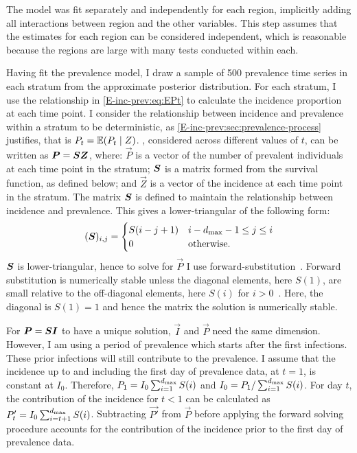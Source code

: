 \documentclass[thesis.tex]{subfiles}
\begin{document}
The model was fit separately and independently for each region, implicitly adding all interactions between region and the other variables.
This step assumes that the estimates for each region can be considered independent, which is reasonable because the regions are large with many tests conducted within each.

Having fit the prevalence model, I draw a sample of 500 prevalence time series in each stratum from the approximate posterior distribution.
For each stratum, I use the relationship in \cref{E-inc-prev:eq:EPt} to calculate the incidence proportion at each time point.
I consider the relationship between incidence and prevalence within a stratum to be deterministic, as \cref{E-inc-prev:sec:prevalence-process} justifies, that is $P_t = \operatorname{\mathbb{E}}(P_t \mid Z)$.
, considered across different values of $t$, can be written as $\bm{P} = \bm{S} \bm{Z}$, where: $\vec{P}$ is a vector of the number of prevalent individuals at each time point in the stratum; $\bm{S}$ is a matrix formed from the survival function, as defined below; and $\vec{Z}$ is a vector of the incidence at each time point in the stratum.
The matrix $\bm{S}$ is defined to maintain the relationship between incidence and prevalence.
This gives a lower-triangular of the following form:
\begin{align}
    (\bm{S})_{i,j} = \begin{cases}
        S(i - j + 1) & i - d_\text{max} - 1 \leq j \leq i \\
        0 & \text{otherwise.}
    \end{cases}
\end{align}
$\bm{S}$ is lower-triangular, hence to solve for $\vec{P}$ I use forward-substitution~\autocite{cormenMatrix}.
Forward substitution is numerically stable unless the diagonal elements, here $S(1)$, are small relative to the off-diagonal elements, here $S(i)$ for $i > 0$~\autocite[section 8.2]{highamAccuracy}.
Here, the diagonal is $S(1) = 1$ and hence the matrix the solution is numerically stable.

For $\bm{P} = \bm{S} \bm{I}$ to have a unique solution, $\vec{I}$ and $\vec{P}$ need the same dimension.
However, I am using a period of prevalence which starts after the first infections.
These prior infections will still contribute to the prevalence.
I assume that the incidence up to and including the first day of prevalence data, at $t = 1$, is constant at $I_0$.
Therefore, $P_1 = I_0 \sum_{i=1}^{d_\text{max}} S(i)$ and $I_0 = P_1 / \sum_{i=1}^{d_\text{max}} S(i)$.
For day $t$, the contribution of the incidence for $t < 1$ can be calculated as $P'_t = I_0 \sum_{i=t+1}^{d_\text{max}} S(i)$.
Subtracting $\vec{P'}$ from $\vec{P}$ before applying the forward solving procedure accounts for the contribution of the incidence prior to the first day of prevalence data.
\end{document}
